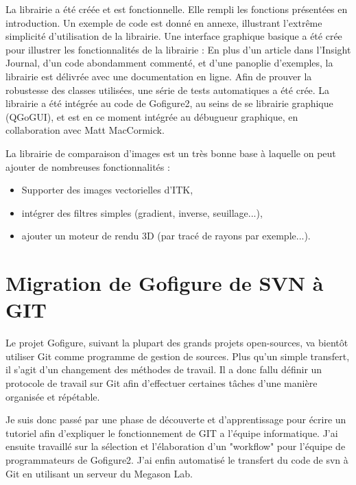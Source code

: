 La librairie a été créée et est fonctionnelle. Elle rempli les fonctions présentées en introduction. Un exemple de code est donné en annexe, illustrant l'extrême simplicité d'utilisation de la librairie.
Une interface graphique basique a été crée pour illustrer les fonctionnalités de la librairie :
En plus d'un article dans l'Insight Journal, d'un code abondamment commenté, et d'une panoplie d'exemples,
la librairie est délivrée avec une documentation en ligne.
Afin de prouver la robustesse des classes utilisées, une série de tests automatiques a été crée.
La librairie a été intégrée au code de Gofigure2, au seins de se librairie graphique (QGoGUI), et est en ce moment intégrée au débugueur graphique, en collaboration avec Matt MacCormick.

La librairie de comparaison d'images est un très bonne base à laquelle on peut ajouter de nombreuses fonctionnalités :
\begin{itemize}
  \item Supporter des images vectorielles d'ITK,
  \item intégrer des filtres simples (gradient, inverse, seuillage...),
  \item ajouter un moteur de rendu 3D (par tracé de rayons par exemple...).
\end{itemize}








\section{Migration de Gofigure de SVN à GIT}

Le projet Gofigure, suivant la plupart des grands projets open-sources, va bientôt utiliser Git comme programme de gestion de sources.
Plus qu'un simple transfert, il s'agit d'un changement des méthodes de travail.
Il a donc fallu définir un protocole de travail sur Git 
afin d'effectuer certaines tâches d'une manière organisée et répétable. 

Je suis donc passé par une phase de découverte et d'apprentissage pour écrire un tutoriel 
afin d'expliquer le fonctionnement de GIT a l'équipe informatique. J'ai ensuite travaillé sur la sélection et l'élaboration d'un "workflow"
pour l'équipe de programmateurs de Gofigure2.
J'ai enfin automatisé le transfert du code de svn à Git en utilisant un serveur du Megason Lab.



